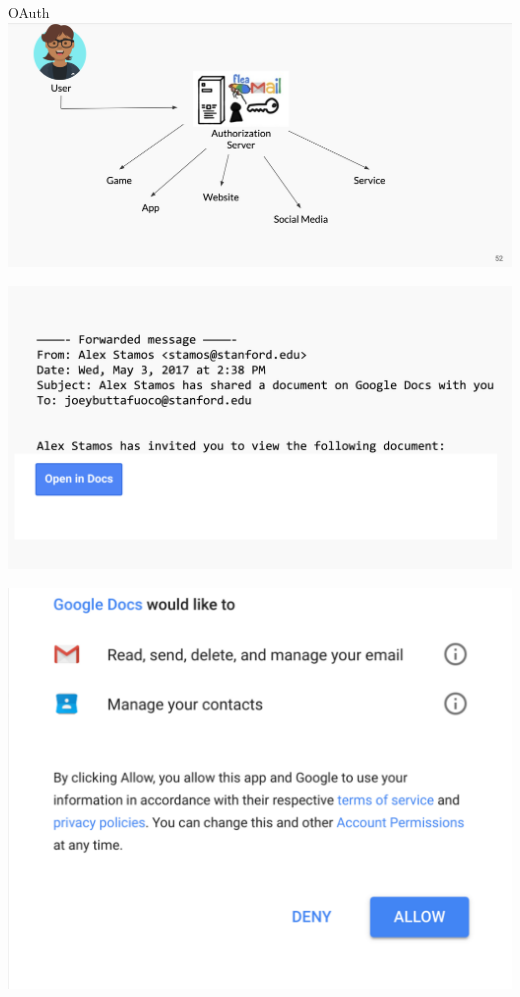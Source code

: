 \documentclass[nobackground,dvipsnames,table]{beamer}
\begin{document}
\begin{frame}{OAuth}
    \includegraphics[width=\textwidth]{oauth}
\end{frame}

\begin{frame}{}%
    \thispagestyle{empty}
    \centering
    \includegraphics[width=\textwidth]{phishy}
\end{frame}

\begin{frame}{}%
    \thispagestyle{empty}
    \includegraphics[height=\paperheight]{google-docs-permissions}
\end{frame}
\end{document}
